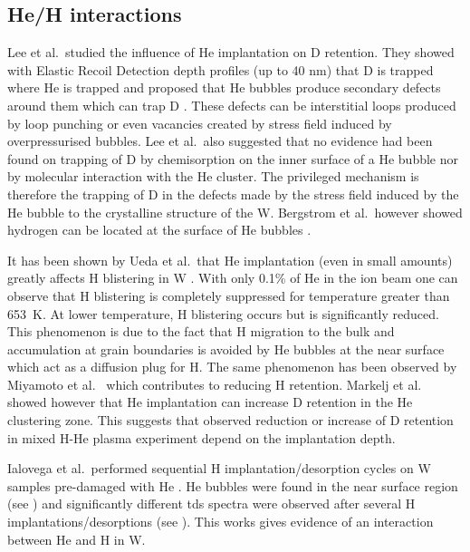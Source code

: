 \subsection{He/H interactions}
Lee et al.\ studied the influence of He implantation on D \gls{retention}.
They showed with Elastic Recoil Detection depth profiles (up to 40 nm) that D is trapped where He is trapped and proposed that He bubbles produce secondary defects around them which can trap D .
These defects can be interstitial loops produced by \gls{loop punching} or even vacancies created by stress field induced by overpressurised bubbles.
Lee et al.\ also suggested that no evidence had been found on trapping of D by chemisorption on the inner surface of a He bubble nor by molecular interaction with the He cluster.
The privileged mechanism is therefore the trapping of D in the defects made by the stress field induced by the He bubble to the crystalline structure of the W.
Bergstrom et al.\ however showed hydrogen can be located at the surface of He bubbles .

It has been shown by Ueda et al.\ that He implantation (even in small amounts) greatly affects \gls{H} blistering in W .
With only 0.1\% of He in the ion beam one can observe that \gls{H} blistering is completely suppressed for temperature greater than \SI{653}{K}.
At lower temperature, \gls{H} blistering occurs but is significantly reduced.
This phenomenon is due to the fact that \gls{H} migration to the bulk and accumulation at grain boundaries is avoided by He bubbles at the near surface which act as a diffusion plug for H.
The same phenomenon has been observed by Miyamoto et al.\  which contributes to reducing \gls{H} \gls{retention}.
Markelj et al.\  showed however that He implantation can increase D \gls{retention} in the He clustering zone.
This suggests that observed reduction or increase of D \gls{retention} in mixed H-He \gls{plasma} experiment depend on the implantation depth.

Ialovega et al.\ performed sequential \gls{H} implantation/desorption cycles on W samples pre-damaged with He .
He bubbles were found in the near surface region (see ) and significantly different \gls{tds} spectra were observed after several \gls{H} implantations/desorptions (see ).
This works gives evidence of an interaction between He and \gls{H} in \gls{W}.

